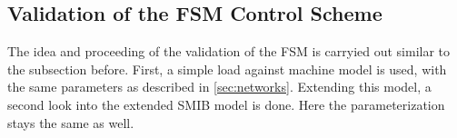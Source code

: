 



\subsection{Validation of the FSM Control Scheme}
\label{sec:validation-fsm-schemes}

The idea and proceeding of the validation of the \acs{FSM} is carryied out similar to the subsection before.
First, a simple load against machine model is used, with the same  parameters as described in \autoref{sec:networks}.
Extending this model, a second look into the extended \acs{SMIB} model is done.
Here the parameterization stays the same as well.

